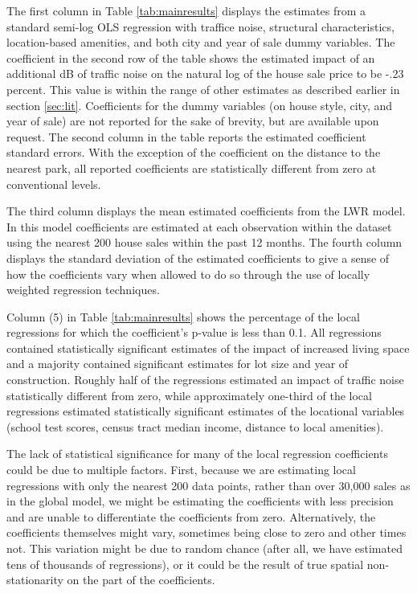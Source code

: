 \documentclass{article}\usepackage{graphicx, color}
\begin{document}
The first column in Table \ref{tab:mainresults} displays the estimates from a standard semi-log OLS regression with traffice noise, structural characteristics, location-based amenities, and both city and year of sale dummy variables. The coefficient in the second row of the table shows the estimated impact of an additional dB of traffic noise on the natural log of the house sale price to be -.23 percent. This value is within the range of other estimates as described earlier in section \ref{sec:lit}. Coefficients for the dummy variables (on house style, city, and year of sale) are not reported for the sake of brevity, but are available upon request. The second column in the table reports the estimated coefficient standard errors. With the exception of the coefficient on the distance to the nearest park, all reported coefficients are statistically different from zero at conventional levels. 

The third column displays the mean estimated coefficients from the LWR model. In this model coefficients are estimated at each observation within the dataset using the nearest 200 house sales within the past 12 months. The fourth column displays the standard deviation of the estimated coefficients to give a sense of how the coefficients vary when allowed to do so through the use of locally weighted regression techniques.

Column (5) in Table \ref{tab:mainresults} shows the percentage of the local regressions for which the coefficient's p-value is less than 0.1. All regressions contained statistically significant estimates of the impact of increased living space and a majority contained significant estimates for lot size and year of construction. Roughly half of the regressions estimated an impact of traffic noise statistically different from zero, while approximately one-third of the local regressions estimated statistically significant estimates of the locational variables (school test scores, census tract median income, distance to local amenities).

The lack of statistical significance for many of the local regression coefficients could be due to multiple factors. First, because we are estimating local regressions with only the nearest 200 data points, rather than over 30,000 sales as in the global model, we might be estimating the coefficients with less precision and are unable to differentiate the coefficients from zero. Alternatively, the coefficients themselves might vary, sometimes being close to zero and other times not. This variation might be due to random chance (after all, we have estimated tens of thousands of regressions), or it could be the result of true spatial non-stationarity on the part of the coefficients. 
\end{document}
